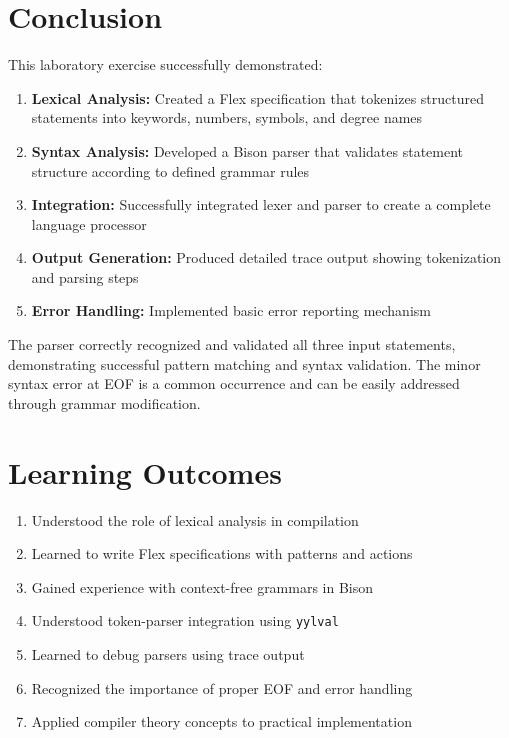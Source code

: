 \documentclass[12pt,a4paper]{article}
\begin{document}
\section{Conclusion}
This laboratory exercise successfully demonstrated:

\begin{enumerate}
    \item \textbf{Lexical Analysis:} Created a Flex specification that tokenizes structured statements into keywords, numbers, symbols, and degree names
    \item \textbf{Syntax Analysis:} Developed a Bison parser that validates statement structure according to defined grammar rules
    \item \textbf{Integration:} Successfully integrated lexer and parser to create a complete language processor
    \item \textbf{Output Generation:} Produced detailed trace output showing tokenization and parsing steps
    \item \textbf{Error Handling:} Implemented basic error reporting mechanism
\end{enumerate}

The parser correctly recognized and validated all three input statements, demonstrating successful pattern matching and syntax validation. The minor syntax error at EOF is a common occurrence and can be easily addressed through grammar modification.

\section{Learning Outcomes}
\begin{enumerate}
    \item Understood the role of lexical analysis in compilation
    \item Learned to write Flex specifications with patterns and actions
    \item Gained experience with context-free grammars in Bison
    \item Understood token-parser integration using \texttt{yylval}
    \item Learned to debug parsers using trace output
    \item Recognized the importance of proper EOF and error handling
    \item Applied compiler theory concepts to practical implementation
\end{enumerate}
\end{document}
